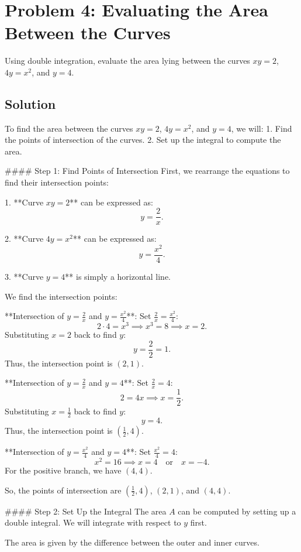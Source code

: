 \documentclass{article}
\begin{document}
\section*{Problem 4: Evaluating the Area Between the Curves}
Using double integration, evaluate the area lying between the curves \( xy = 2 \), \( 4y = x^2 \), and \( y = 4 \).

\subsection*{Solution}
To find the area between the curves \( xy = 2 \), \( 4y = x^2 \), and \( y = 4 \), we will:
1. Find the points of intersection of the curves.
2. Set up the integral to compute the area.

#### Step 1: Find Points of Intersection
First, we rearrange the equations to find their intersection points:

1. **Curve \( xy = 2 \)** can be expressed as:
   \[
   y = \frac{2}{x}.
   \]

2. **Curve \( 4y = x^2 \)** can be expressed as:
   \[
   y = \frac{x^2}{4}.
   \]

3. **Curve \( y = 4 \)** is simply a horizontal line.

We find the intersection points:

**Intersection of \( y = \frac{2}{x} \) and \( y = \frac{x^2}{4} \)**:
Set \( \frac{2}{x} = \frac{x^2}{4} \):
\[
2 \cdot 4 = x^3 \implies x^3 = 8 \implies x = 2.
\]
Substituting \( x = 2 \) back to find \( y \):
\[
y = \frac{2}{2} = 1.
\]
Thus, the intersection point is \( (2, 1) \).

**Intersection of \( y = \frac{2}{x} \) and \( y = 4 \)**:
Set \( \frac{2}{x} = 4 \):
\[
2 = 4x \implies x = \frac{1}{2}.
\]
Substituting \( x = \frac{1}{2} \) back to find \( y \):
\[
y = 4.
\]
Thus, the intersection point is \( \left(\frac{1}{2}, 4\right) \).

**Intersection of \( y = \frac{x^2}{4} \) and \( y = 4 \)**:
Set \( \frac{x^2}{4} = 4 \):
\[
x^2 = 16 \implies x = 4 \quad \text{or} \quad x = -4.
\]
For the positive branch, we have \( (4, 4) \).

So, the points of intersection are \( \left(\frac{1}{2}, 4\right) \), \( (2, 1) \), and \( (4, 4) \).

#### Step 2: Set Up the Integral
The area \( A \) can be computed by setting up a double integral. We will integrate with respect to \( y \) first.

The area is given by the difference between the outer and inner curves.
\end{document}
